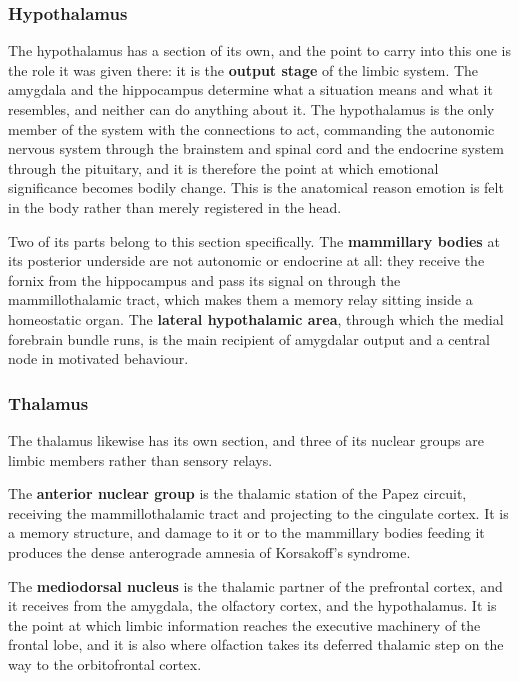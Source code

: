 \documentclass[11pt]{article}
\begin{document}
\subsubsection{Hypothalamus}

The hypothalamus has a section of its own, and the point to carry into this one is the role it was given there: it is the \textbf{output stage} of the limbic system. The amygdala and the hippocampus determine what a situation means and what it resembles, and neither can do anything about it. The hypothalamus is the only member of the system with the connections to act, commanding the autonomic nervous system through the brainstem and spinal cord and the endocrine system through the pituitary, and it is therefore the point at which emotional significance becomes bodily change. This is the anatomical reason emotion is felt in the body rather than merely registered in the head.

Two of its parts belong to this section specifically. The \textbf{mammillary bodies} at its posterior underside are not autonomic or endocrine at all: they receive the fornix from the hippocampus and pass its signal on through the mammillothalamic tract, which makes them a memory relay sitting inside a homeostatic organ. The \textbf{lateral hypothalamic area}, through which the medial forebrain bundle runs, is the main recipient of amygdalar output and a central node in motivated behaviour.

\subsubsection{Thalamus}

The thalamus likewise has its own section, and three of its nuclear groups are limbic members rather than sensory relays.

The \textbf{anterior nuclear group} is the thalamic station of the Papez circuit, receiving the mammillothalamic tract and projecting to the cingulate cortex. It is a memory structure, and damage to it or to the mammillary bodies feeding it produces the dense anterograde amnesia of Korsakoff's syndrome.

The \textbf{mediodorsal nucleus} is the thalamic partner of the prefrontal cortex, and it receives from the amygdala, the olfactory cortex, and the hypothalamus. It is the point at which limbic information reaches the executive machinery of the frontal lobe, and it is also where olfaction takes its deferred thalamic step on the way to the orbitofrontal cortex.
\end{document}
